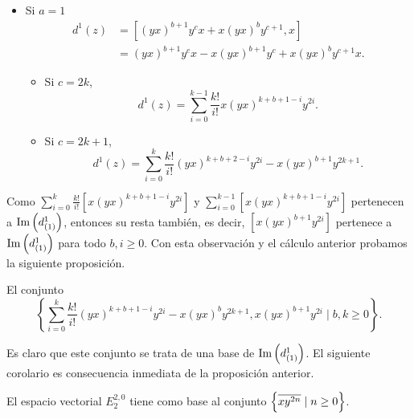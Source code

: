 \documentclass[fleqn,../tesis.tex]{subfiles}
\begin{document}
\begin{itemize}
\begin{itemize}
\begin{itemize}
        \end{itemize}
    \end{itemize}
    \item Si $a = 1$
       \begin{align*}
           d^1(z) &= \left[(yx)^{b + 1}y^cx  + x(yx)^{b}y^{c + 1}, x\right]\\
           &= (yx)^{b + 1}y^{c}x - x(yx)^{b + 1}y^{c} + x(yx)^b y^{c + 1}x.
       \end{align*}
    \begin{itemize}
        \item Si $c = 2k$,
        \[
             d^1(z) = \sum_{i = 0}^{k - 1}\frac{k!}{i!} x(yx)^{k + b + 1 -i}y^{2i}.           
        \]
        \item Si $c = 2k + 1$,
        \[
            d^1(z) = \sum_{i = 0}^{k}\frac{k!}{i!} (yx)^{k  + b + 2 -i}y^{2i} - x(yx)^{b + 1}y^{2k + 1}.
        \]
    \end{itemize}
\end{itemize}
Como $\sum_{i = 0}^{k}\frac{k!}{i!}\left[x(yx)^{k +  b + 1 - i}y^{2i}\right]$ y $\sum_{i = 0}^{k - 1}\left[x(yx)^{k + b + 1 -i}y^{2i}\right]$
pertenecen a $\operatorname{Im}\left(d^{1}_{(1)}\right)$, entonces su resta también, es decir, $\left[x(yx)^{b + 1}y^{2i}\right]$ pertenece a $\operatorname{Im}\left(d^{1}_{(1)}\right)$
para todo $b, i \geq 0$. Con esta observación y el cálculo anterior probamos la siguiente proposición.
\begin{prop}
    El conjunto
    \[
        \left\lbrace \sum_{i = 0}^{k}\frac{k!}{i!}(yx)^{k + b + 1 - i}y^{2i} - x(yx)^{b}y^{2k + 1},
            x(yx)^{b + 1}y^{2i} \mid b, k \geq 0 \right\rbrace.    
    \]
\end{prop}
Es claro que este conjunto se trata de una base de $\operatorname{Im}\left(d^{1}_{(1)}\right)$. El siguiente corolario
es consecuencia inmediata de la proposición anterior.
\begin{prop}
    El espacio vectorial $E^{2, 0}_{2}$ tiene como base al conjunto $\left\lbrace \overline{xy^{2n}} \mid n \geq 0\right\rbrace$.
\end{prop}
\end{document}
